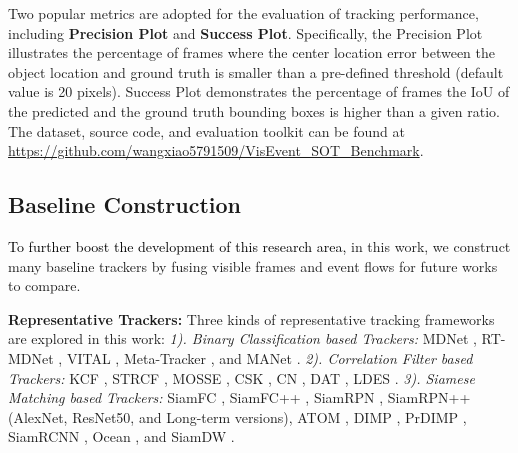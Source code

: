 \documentclass[journal]{IEEEtran}
\begin{document}
Two popular metrics are adopted for the evaluation of tracking performance, including \textbf{Precision Plot} and \textbf{Success Plot}. Specifically, the Precision Plot illustrates the percentage of frames where the center location error between the object location and ground truth is smaller than a pre-defined threshold (default value is 20 pixels). Success Plot demonstrates the percentage of frames the IoU of the predicted and the ground truth bounding boxes is higher than a given ratio. The dataset, source code, and evaluation toolkit can be found at \url{https://github.com/wangxiao5791509/VisEvent_SOT_Benchmark}. 




\subsection{Baseline Construction}  \label{baselineConst}

\textcolor{black}{To further boost the development of this research area,} in this work, we construct many baseline trackers by fusing visible frames and event flows for future works to compare. 


\textbf{ Representative Trackers: } 
Three kinds of representative tracking frameworks are explored in this work:  \emph{1). Binary Classification based Trackers:} 
MDNet \cite{Nam2015Learning}, RT-MDNet \cite{Jung_2018_ECCV}, VITAL \cite{song2018vital}, Meta-Tracker \cite{Park_2018_ECCV}, and MANet \cite{li2019MANet}. 
\emph{2). Correlation Filter based Trackers:} 
KCF \cite{Henriques2015High},  STRCF \cite{li2018STRCF},  MOSSE \cite{bolme2010MOSSE},   CSK \cite{henriques2012CSK},   CN \cite{danelljan2014CN},  DAT \cite{possegger2015DAT},   LDES \cite{li2019LDES}.    \emph{3). Siamese Matching based Trackers:} 
SiamFC \cite{bertinetto2016siamfc}, SiamFC++ \cite{xu2020siamfc++}, SiamRPN \cite{li2018siamRPN}, SiamRPN++ \cite{li2018siamrpn++} (AlexNet, ResNet50, and Long-term versions), ATOM \cite{danelljan2019atom}, DIMP \cite{bhat2019DiMP}, PrDIMP \cite{danelljan2020PRDiMP}, SiamRCNN \cite{voigtlaender2020siamRCNN}, Ocean \cite{zhang2020ocean}, and SiamDW \cite{siamdw2019}. 
\end{document}
